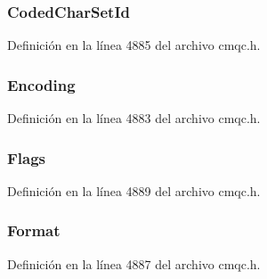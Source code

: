 \subsubsection[{Coded\+Char\+Set\+Id}]{ Coded\+Char\+Set\+Id}\label{structtag_m_q_r_f_h_a4d8d1961a991850d1355cdf9b4680b8e}


Definición en la línea 4885 del archivo cmqc.\+h.

\hypertarget{structtag_m_q_r_f_h_a30167bf454a49a60fd3fe4e9e586af34}{}
\subsubsection[{Encoding}]{ Encoding}\label{structtag_m_q_r_f_h_a30167bf454a49a60fd3fe4e9e586af34}


Definición en la línea 4883 del archivo cmqc.\+h.

\hypertarget{structtag_m_q_r_f_h_a8da770267273b200fa9c968fa2a0da57}{}
\subsubsection[{Flags}]{ Flags}\label{structtag_m_q_r_f_h_a8da770267273b200fa9c968fa2a0da57}


Definición en la línea 4889 del archivo cmqc.\+h.

\hypertarget{structtag_m_q_r_f_h_a435a478822008713f8aaff89f369ed63}{}
\subsubsection[{Format}]{ Format}\label{structtag_m_q_r_f_h_a435a478822008713f8aaff89f369ed63}


Definición en la línea 4887 del archivo cmqc.\+h.

\hypertarget{structtag_m_q_r_f_h_a0530922ca944569b52601d74941f96e4}{}
